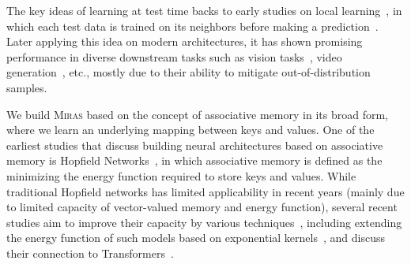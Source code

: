 \documentclass{article}
\newcommand{\citep}{\parencite}
\newcommand{\framework}[0]{\textsc{Miras}}
\theoremstyle{plain}
\theoremstyle{definition}
\theoremstyle{remark}
\newcommand{\head}[1]{\vspace{1.7mm}\noindent{{\textcolor{c2}{\bf #1.}}}}
\begin{document}
\head{Test Time Training}
The key ideas of learning at test time backs to early studies on local learning~\cite{bottou1992local}, in which each test data is trained on its neighbors before making a prediction~\citep{zhang2006svm, gandelsman2022test}. Later applying this idea on modern architectures, it has shown promising performance in diverse downstream tasks such as vision tasks~\citep{jain2011online, mullapudi2019online}, video generation~\citep{dalal2025one}, etc., mostly due to their ability to mitigate out-of-distribution samples. 



\head{Hopfield Networks}
We build \framework{} based on the concept of associative memory in its broad form, where we learn an underlying mapping between keys and values. One of the earliest studies that discuss building neural architectures based on associative memory is Hopfield Networks~\citep{hopfield1982neural}, in which associative memory is defined as the minimizing the energy function required to store keys and values. While traditional Hopfield networks has limited applicability in recent years (mainly due to limited capacity of vector-valued memory and energy function), several recent studies aim to improve their capacity by various techniques~\citep{krotov2021hierarchical, li2024expressive, krotov2016dense}, including extending the energy function of such models based on exponential kernels~\citep{krotov2016dense, lucibello2024exponential}, and discuss their connection to Transformers~\citep{ramsauer2021hopfield, hu2024provably}.   
\end{document}
